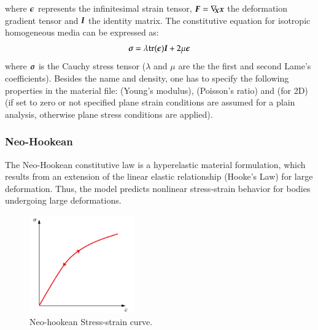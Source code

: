 where $\boldsymbol{\epsilon}$ represents the infinitesimal strain tensor, $\boldsymbol{F} =
\nabla_{\!\!\boldsymbol{X}}\boldsymbol{x}$ the deformation gradient tensor and $\boldsymbol{I}$ the
identity matrix. The constitutive equation for isotropic homogeneous media can
be expressed as:
\begin{equation}\label{eqn:smm:material:constitutive_elastic}
  \boldsymbol{\sigma } =\lambda\mathrm{tr}(\boldsymbol{\epsilon})\boldsymbol{I}+2 \mu \boldsymbol{\epsilon}
\end{equation}
where $\boldsymbol{\sigma}$ is the Cauchy stress tensor ($\lambda$ and $\mu$ are the
the first and second Lame's coefficients). Besides the name and density, one has
to specify the following properties in the material file:  (Young's
modulus),  (Poisson's ratio) and (for 2D)  (if set
to zero or not specified plane strain conditions are assumed for a plain
analysis, otherwise plane stress conditions are applied).


\subsubsection{Neo-Hookean}
The Neo-Hookean constitutive law is a hyperelastic material formulation, which
results from an extension of the linear elastic relationship (Hooke's Law) for
large deformation. Thus, the model predicts nonlinear stress-strain behavior for
bodies undergoing large deformations.

\begin{figure}[!htb]
  \begin{center}
    \includegraphics[width=0.4\textwidth,keepaspectratio=true]{figures/stress_strain_neo.pdf}
    \caption{Neo-hookean Stress-strain curve.}
    \label{fig:smm:cl:neo_hookean}
  \end{center}
\end{figure}

